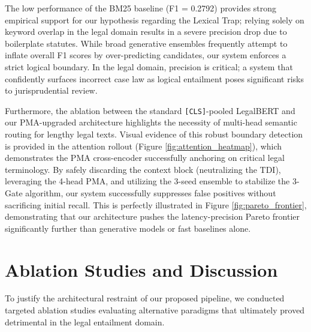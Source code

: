 \documentclass[sigconf]{acmart}
\begin{document}
The low performance of the BM25 baseline (F1 = 0.2792) provides strong empirical support for our hypothesis regarding the Lexical Trap; relying solely on keyword overlap in the legal domain results in a severe precision drop due to boilerplate statutes. While broad generative ensembles frequently attempt to inflate overall F1 scores by over-predicting candidates, our system enforces a strict logical boundary. In the legal domain, precision is critical; a system that confidently surfaces incorrect case law as logical entailment poses significant risks to jurisprudential review. 

Furthermore, the ablation between the standard \texttt{[CLS]}-pooled LegalBERT and our PMA-upgraded architecture highlights the necessity of multi-head semantic routing for lengthy legal texts. Visual evidence of this robust boundary detection is provided in the attention rollout (Figure \ref{fig:attention_heatmap}), which demonstrates the PMA cross-encoder successfully anchoring on critical legal terminology. By safely discarding the context block (neutralizing the TDI), leveraging the 4-head PMA, and utilizing the 3-seed ensemble to stabilize the 3-Gate algorithm, our system successfully suppresses false positives without sacrificing initial recall. This is perfectly illustrated in Figure \ref{fig:pareto_frontier}, demonstrating that our architecture pushes the latency-precision Pareto frontier significantly further than generative models or fast baselines alone.

\section{Ablation Studies and Discussion}

To justify the architectural restraint of our proposed pipeline, we conducted targeted ablation studies evaluating alternative paradigms that ultimately proved detrimental in the legal entailment domain.
\end{document}

